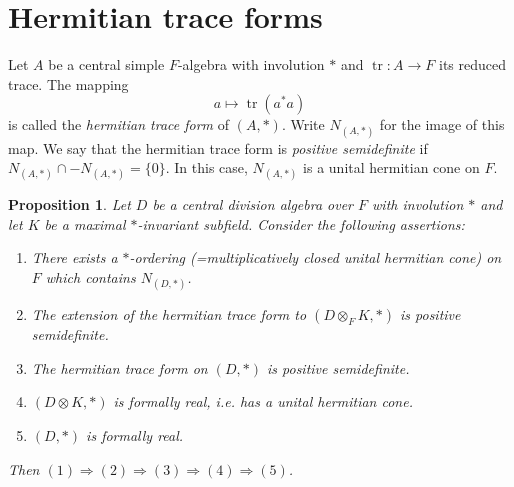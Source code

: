 \documentclass[12pt,reqno]{amsart}
\newtheorem{prop}[thm]{Proposition}
\theoremstyle{definition}
\DeclareMathOperator{\tr}{tr}
\begin{document}
\section{Hermitian trace forms}
\label{last}

Let $A$ be a central simple $F$-algebra with involution $\ast$ and 
$\tr \colon A \to F$ its reduced trace. The mapping 
\[
a \mapsto \tr(a^\ast a)
\]
is called the \textit{hermitian trace form} of $(A,\ast)$. Write
$N_{(A,\ast)}$ for the image of this map. We say that the
hermitian trace form is \textit{positive semidefinite} if
$N_{(A,\ast)} \cap - N_{(A,\ast)} = \{0\}$. In this case,
$N_{(A,\ast)}$ is a unital hermitian cone on $F$.


\begin{prop}
Let $D$ be a central division algebra over $F$ with involution $\ast$
and let $K$ be a maximal $\ast$-invariant subfield. 
Consider the following assertions:
\begin{enumerate}
\item There exists a $\ast$-ordering (=multiplicatively closed unital hermitian cone)
on $F$ which contains $N_{(D,\ast)}$.
\item The extension of the hermitian trace form to $(D \otimes_F K,\ast)$ is positive semidefinite.
\item The hermitian trace form on $(D,\ast)$ is positive semidefinite.
\item $(D \otimes K,\ast)$ is formally real, i.e. has a unital hermitian cone.
\item $(D,\ast)$ is formally real.
\end{enumerate}
Then $(1) \Rightarrow (2) \Rightarrow (3) \Rightarrow (4) \Rightarrow (5)$.
\end{prop}
\end{document}

